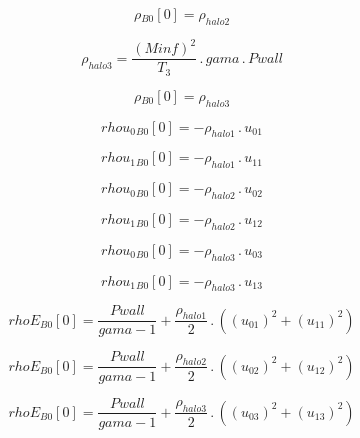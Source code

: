 \documentclass{article}
\begin{document}
\begin{dmath}{\rho{_{B0}}}[{0}] = \rho_{halo 2}\end{dmath}

\begin{dmath}\rho_{halo 3} = \frac{\left(Minf \right)^{2}}{T_{3}} \,.\, gama \,.\, Pwall\end{dmath}

\begin{dmath}{\rho{_{B0}}}[{0}] = \rho_{halo 3}\end{dmath}

\begin{dmath}{rhou_{0}{_{B0}}}[{0}] = - \rho_{halo 1} \,.\, u_{01}\end{dmath}

\begin{dmath}{rhou_{1}{_{B0}}}[{0}] = - \rho_{halo 1} \,.\, u_{11}\end{dmath}

\begin{dmath}{rhou_{0}{_{B0}}}[{0}] = - \rho_{halo 2} \,.\, u_{02}\end{dmath}

\begin{dmath}{rhou_{1}{_{B0}}}[{0}] = - \rho_{halo 2} \,.\, u_{12}\end{dmath}

\begin{dmath}{rhou_{0}{_{B0}}}[{0}] = - \rho_{halo 3} \,.\, u_{03}\end{dmath}

\begin{dmath}{rhou_{1}{_{B0}}}[{0}] = - \rho_{halo 3} \,.\, u_{13}\end{dmath}

\begin{dmath}{rhoE{_{B0}}}[{0}] = \frac{Pwall}{gama - 1} + \frac{\rho_{halo 1}}{2} \,.\, \left(\left(u_{01} \right)^{2} + \left(u_{11} \right)^{2}\right)\end{dmath}

\begin{dmath}{rhoE{_{B0}}}[{0}] = \frac{Pwall}{gama - 1} + \frac{\rho_{halo 2}}{2} \,.\, \left(\left(u_{02} \right)^{2} + \left(u_{12} \right)^{2}\right)\end{dmath}

\begin{dmath}{rhoE{_{B0}}}[{0}] = \frac{Pwall}{gama - 1} + \frac{\rho_{halo 3}}{2} \,.\, \left(\left(u_{03} \right)^{2} + \left(u_{13} \right)^{2}\right)\end{dmath}
\end{document}
